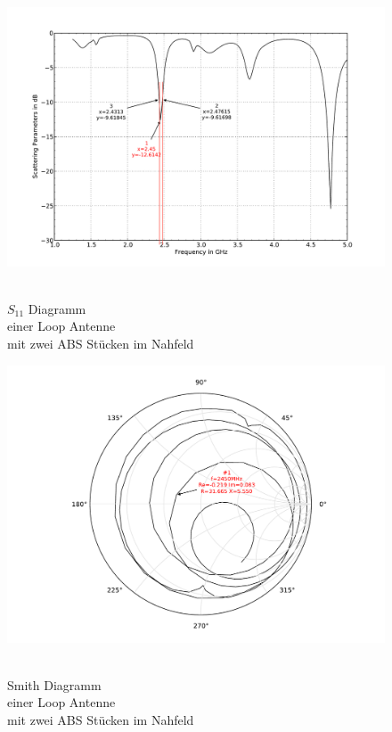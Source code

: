 \begin{figure}[!ht]
\begin{center} 
  \includegraphics[width=\linewidth]{content/bilder/Evaluation/Loop/Kurz3/S11Loop2ABS.pdf}
  \caption{\\$S_{11}$ Diagramm \\einer Loop Antenne \\mit zwei ABS Stücken im Nahfeld}\label{fig:S11_Loop_2ABS_5}
\endminipage%
{}
  \includegraphics[width=\linewidth]{content/bilder/Evaluation/Loop/Kurz3/SmithLoop2ABS.pdf}
  \caption{\\Smith Diagramm \\einer Loop Antenne \\mit zwei ABS Stücken im Nahfeld}\label{fig:Smith_Loop_2ABS_6}
\endminipage
\end{center}
\end{figure}
